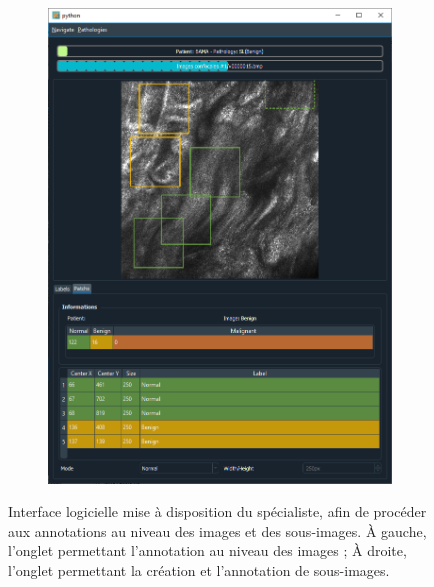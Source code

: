 \begin{figure}[H]
\begin{subfigure}{.45\textwidth}
      \includegraphics[width=\linewidth]{contents/ii_preamble_microscopy/resources/example_gui_annotation_2.png}
    \end{subfigure}
    \caption{Interface logicielle mise à disposition du spécialiste, afin de procéder aux annotations au niveau des images et des sous-images. À gauche, l'onglet permettant l'annotation au niveau des images ; À droite, l'onglet permettant la création et l'annotation de sous-images.}
    \label{fig:example_gui_annotation}
\end{figure}

